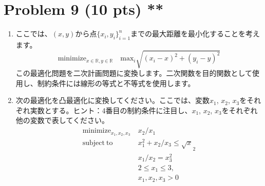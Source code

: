\documentclass{jsarticle}
\begin{document}
\section*{Problem 9 (10 pts) **}
\begin{enumerate}
  \item ここでは、$(x,y)$から点$\{x_i,y_i\}^n_{i=1}$までの最大距離を最小化することを考えます。
  $$
  \mathrm{minimize}_{x\in\mathbb R,y\in\mathbb R}\quad\mathrm{max}_i\sqrt{(x_i-x)^2+(y_i-y)^2}
  $$
  この最適化問題を二次計画問題に変換します。二次関数を目的関数として使用し、制約条件には線形の等式と不等式を使用します。
  \item 次の最適化を凸最適化に変換してください。ここでは、変数$x_1$, $x_2$, $x_3$をそれぞれ実数とする。ヒント：4番目の制約条件に注目し、$x_1$, $x_2$, $x_3$をそれぞれ他の変数で表してください。
  \begin{align}
    \nonumber
    \mathrm{minimize}_{x_1,x_2,x_3}&\ x_2/x_1 \\
    \nonumber
    \mathrm{subject\ to}&\ x_1^2+x_2/x_3 \le \sqrt x_2 \\
    \nonumber
    &\ x_1/x_2 = x_3^2 \\
    \nonumber
    &\ 2 \le x_1 \le3, \\
    \nonumber
    &\ x_1,x_2,x_3 >0 
  \end{align}
\end{enumerate}

　　
\end{document}
